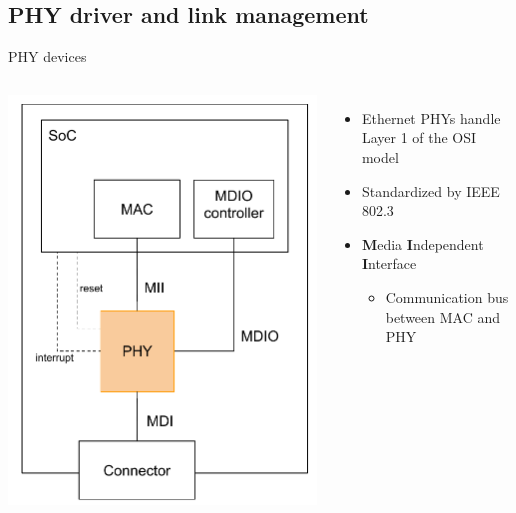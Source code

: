 \subsection{PHY driver and link management}

\begin{frame}{PHY devices}
	\begin{columns}
		\includegraphics[width=\textwidth]{slides/networking-driver-phy/phy_easy.pdf}
		\begin{itemize}
			\item Ethernet PHYs handle Layer 1 of the OSI model
			\item Standardized by IEEE 802.3
			\item \textbf{M}edia \textbf{I}ndependent \textbf{I}nterface
				\begin{itemize}
					\item Communication bus between MAC and PHY
				\end{itemize}

\end{itemize}
\end{columns}
\end{frame}
